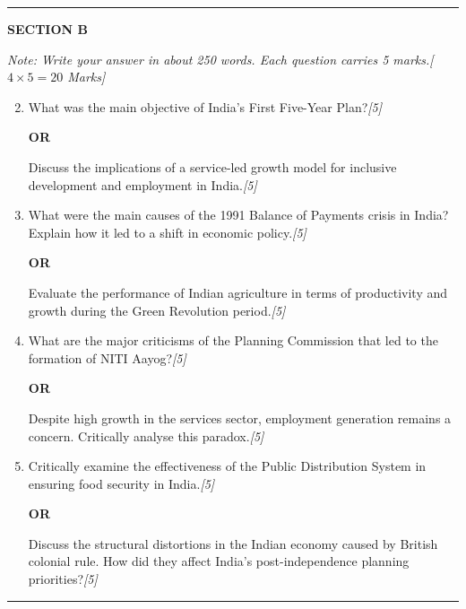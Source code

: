 \documentclass[11pt,a4paper]{article}
\newcommand{\pts}[1]{\hfill   \textit{[#1]}}
\begin{document}
\bigskip
\rule{\linewidth}{0.2pt}
\medskip

\centerline{   \textbf{SECTION B}}
\smallskip



\noindent   \textit{Note: Write your answer in about 250 words. Each question carries 5 marks.\hfill [$4  \times 5 = 20$ Marks]}


\begin{enumerate}[label=   \textbf{\arabic*.}]
    \setcounter{enumi}{1}
    \item What was the main objective of India's First Five-Year Plan?\pts{5}
    
\begin{center}   \textbf{OR}\end{center}
    Discuss the implications of a service-led growth model for inclusive development and employment in India.\pts{5}

    \item What were the main causes of the 1991 Balance of Payments crisis in India? Explain how it led to a shift in economic policy.\pts{5}
    
\begin{center}   \textbf{OR}\end{center}
    Evaluate the performance of Indian agriculture in terms of productivity and growth during the Green Revolution period.\pts{5}

    \item What are the major criticisms of the Planning Commission that led to the formation of NITI Aayog?\pts{5}
    
\begin{center}   \textbf{OR}\end{center}
    Despite high growth in the services sector, employment generation remains a concern. Critically analyse this paradox.\pts{5}

    \item Critically examine the effectiveness of the Public Distribution System in ensuring food security in India.\pts{5}
    
\begin{center}   \textbf{OR}\end{center}
    Discuss the structural distortions in the Indian economy caused by British colonial rule. How did they affect India's post-independence planning priorities?\pts{5}
\end{enumerate}

\bigskip
\rule{\linewidth}{0.2pt}
\medskip
\end{document}
